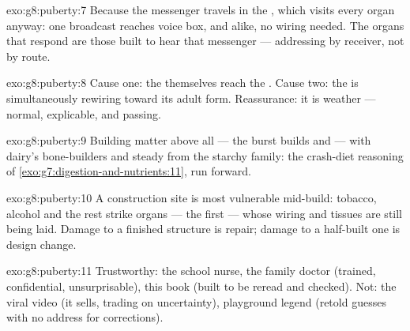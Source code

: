 \begin{solution}{exo:g8:puberty:7}
Because the messenger travels in the , which visits
every organ anyway: one broadcast reaches voice box,
 and  alike, no wiring needed. The organs
that respond are those built to hear that messenger ---
addressing by receiver, not by route.
\end{solution}

\begin{solution}{exo:g8:puberty:8}
Cause one: the   themselves reach the
. Cause two: the  is simultaneously rewiring
toward its adult form. Reassurance: it is weather ---
normal, explicable, and passing.
\end{solution}

\begin{solution}{exo:g8:puberty:9}
Building matter above all --- the burst builds  and
 --- with dairy's bone-builders and steady 
from the starchy family: the crash-diet reasoning of
\cref{exo:g7:digestion-and-nutrients:11}, run forward.
\end{solution}

\begin{solution}{exo:g8:puberty:10}
A construction site is most vulnerable mid-build:
tobacco, alcohol and the rest strike organs --- the 
first --- whose wiring and tissues are still being laid.
Damage to a finished structure is repair; damage to a
half-built one is design change.
\end{solution}

\begin{solution}{exo:g8:puberty:11}
Trustworthy: the school nurse, the family doctor (trained,
confidential, unsurprisable), this book (built to be
reread and checked). Not: the viral video (it sells,
trading on uncertainty), playground legend (retold guesses
with no address for corrections).
\end{solution}

